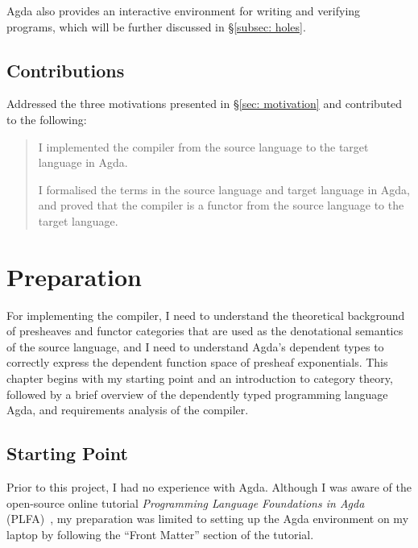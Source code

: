 \documentclass[12pt,twoside,a4paper]{report}
\theoremstyle{definition}
\theoremstyle{definition}
\theoremstyle{definition}
\theoremstyle{definition}
\newcounter{motivation}
\newcommand{\secref}[1]{\S\ref{#1}}
\begin{document}
        Agda also provides an interactive environment for writing and verifying programs, which will be further discussed in \secref{subsec: holes}.

    \section{Contributions}
        Addressed the three motivations presented in \secref{sec: motivation} and contributed to the following:
        \begin{quote}
            \savedmotivationI
            I implemented the compiler from the source language to the target language in Agda. 

            \savedmotivationII
            I formalised the terms in the source language and target language in Agda, and proved that the compiler is a functor from the source language to the target language. 

        \end{quote}


\chapter{Preparation}
    \minitoc

    For implementing the compiler, I need to understand the theoretical background of presheaves and functor categories that are used as the denotational semantics of the source language, and I need to understand Agda's dependent types to correctly express the dependent function space of presheaf exponentials. This chapter begins with my starting point and an introduction to category theory, followed by a brief overview of the dependently typed programming language Agda, and requirements analysis of the compiler.

    \section{Starting Point}
    Prior to this project, I had no experience with Agda. Although I was aware of the open-source online tutorial \textit{Programming Language Foundations in Agda} (PLFA)~\cite{plfa}, my preparation was limited to setting up the Agda environment on my laptop by following the ``Front Matter'' section of the tutorial.
\end{document}
